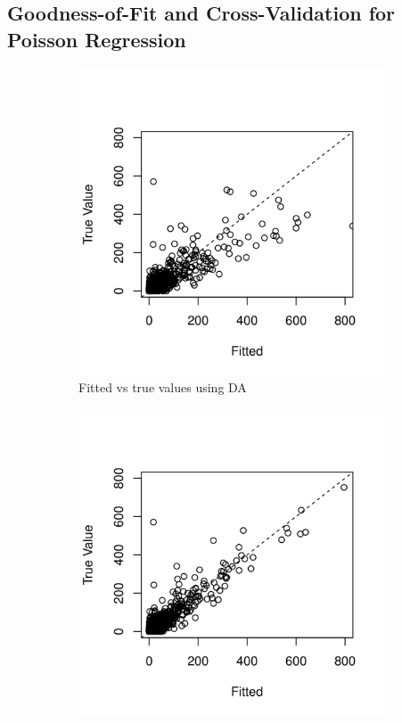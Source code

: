 \documentclass[10pt]{article}
\begin{document}
\subsection{Goodness-of-Fit and Cross-Validation for Poisson Regression}


 \begin{figure}[H]
   \begin{subfigure}[b]{0.45\textwidth}
 \includegraphics[width=1\textwidth]{poisson_fitting_da.png}
 \caption{Fitted vs true values using DA}
 \end{subfigure}
  \hfill 
 \begin{subfigure}[b]{0.45\textwidth}
 \includegraphics[width=1\textwidth]{poisson_fitting_ada.png}

\end{subfigure}
\end{figure}
\end{document}
